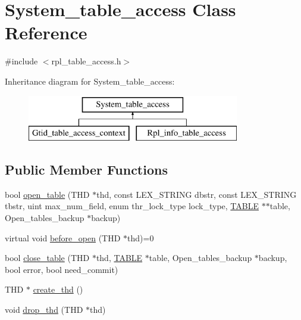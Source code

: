 \hypertarget{classSystem__table__access}{}\section{System\+\_\+table\+\_\+access Class Reference}
\label{classSystem__table__access}


{\ttfamily \#include $<$rpl\+\_\+table\+\_\+access.\+h$>$}

Inheritance diagram for System\+\_\+table\+\_\+access\+:\begin{figure}[H]
\begin{center}
\leavevmode
\includegraphics[height=2.000000cm]{classSystem__table__access}
\end{center}
\end{figure}
\subsection*{Public Member Functions}
\begin{DoxyCompactItemize}
\item 
bool \mbox{\hyperlink{classSystem__table__access_a8bf7d377c3f2a5e96af95fef28f689c7}{open\+\_\+table}} (T\+HD $\ast$thd, const L\+E\+X\+\_\+\+S\+T\+R\+I\+NG dbstr, const L\+E\+X\+\_\+\+S\+T\+R\+I\+NG tbstr, uint max\+\_\+num\+\_\+field, enum thr\+\_\+lock\+\_\+type lock\+\_\+type, \mbox{\hyperlink{structTABLE}{T\+A\+B\+LE}} $\ast$$\ast$table, Open\+\_\+tables\+\_\+backup $\ast$backup)
\item 
virtual void \mbox{\hyperlink{classSystem__table__access_a7357c29323649f270cf35b08cd8fe826}{before\+\_\+open}} (T\+HD $\ast$thd)=0
\item 
bool \mbox{\hyperlink{classSystem__table__access_a4c0fc8878c168fcac8a7671c3e536fdc}{close\+\_\+table}} (T\+HD $\ast$thd, \mbox{\hyperlink{structTABLE}{T\+A\+B\+LE}} $\ast$table, Open\+\_\+tables\+\_\+backup $\ast$backup, bool error, bool need\+\_\+commit)
\item 
T\+HD $\ast$ \mbox{\hyperlink{classSystem__table__access_acefc48e24e7e4f522bafae15493d3a30}{create\+\_\+thd}} ()
\item 
void \mbox{\hyperlink{classSystem__table__access_a392fdc79727da6841d45a6c1f415ae53}{drop\+\_\+thd}} (T\+HD $\ast$thd)
\end{DoxyCompactItemize}
